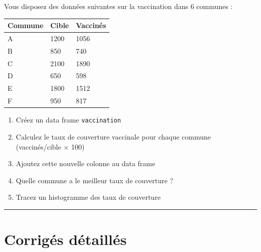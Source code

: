 \documentclass[
  french,
  11pt,
  a4paper,
]{article}
\newcounter{none} %
\providecommand{\tightlist}{%
  \setlength{\itemsep}{0pt}\setlength{\parskip}{0pt}}
\begin{document}
\begin{tcolorbox}[enhanced jigsaw, arc=.35mm, bottomrule=.15mm, bottomtitle=1mm, breakable, colback=white, colbacktitle=quarto-callout-caution-color!10!white, colframe=quarto-callout-caution-color-frame, coltitle=black, left=2mm, leftrule=.75mm, opacityback=0, opacitybacktitle=0.6, rightrule=.15mm, title=\textcolor{quarto-callout-caution-color}{\faFire}\hspace{0.5em}{Exercice 15}, titlerule=0mm, toprule=.15mm, toptitle=1mm]

Vous disposez des données suivantes sur la vaccination dans 6 communes :

{\def\LTcaptype{none} %
\begin{longtable}[]{@{}lll@{}}
\toprule\noalign{}
Commune & Cible & Vaccinés \\
\midrule\noalign{}
\endhead
\bottomrule\noalign{}
\endlastfoot
A & 1200 & 1056 \\
B & 850 & 740 \\
C & 2100 & 1890 \\
D & 650 & 598 \\
E & 1800 & 1512 \\
F & 950 & 817 \\
\end{longtable}
}

\begin{enumerate}
\def\labelenumi{\arabic{enumi}.}
\tightlist
\item
  Créez un data frame \texttt{vaccination}
\item
  Calculez le taux de couverture vaccinale pour chaque commune
  (vaccinés/cible × 100)
\item
  Ajoutez cette nouvelle colonne au data frame
\item
  Quelle commune a le meilleur taux de couverture ?
\item
  Tracez un histogramme des taux de couverture
\end{enumerate}

\end{tcolorbox}

\begin{center}\rule{0.5\linewidth}{0.5pt}\end{center}

\section{Corrigés détaillés}\label{corriguxe9s-duxe9tailluxe9s}
\end{document}
